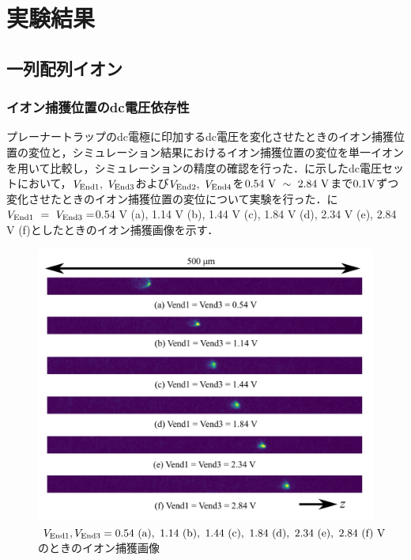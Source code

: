 \chapter{実験結果}\label{result}
\section{一列配列イオン}
\subsection{イオン捕獲位置のdc電圧依存性}\label{quantity_1}
プレーナートラップのdc電極に印加するdc電圧を変化させたときのイオン捕獲位置の変位と，シミュレーション結果におけるイオン捕獲位置の変位を単一イオンを用いて比較し，シミュレーションの精度の確認を行った．に示したdc電圧セットにおいて，$V_{\rm End 1}, \ V_{\rm End3}$および$V_{\rm End 2}, \ V_{\rm End4}$を$0.54 \ {\rm V} \ \sim \ 2.84 \ {\rm V}$まで$0.1 {\rm V}$ずつ変化させたときのイオン捕獲位置の変位について実験を行った．に$V_{\rm End 1} \ = \ V_{\rm End3} = $0.54 V (a), 1.14 V (b), 1.44 V (c), 1.84 V (d), 2.34 V (e), 2.84 V (f)としたときのイオン捕獲画像を示す．

\begin{figure}[h]
	\begin{center}
		\includegraphics[width = 0.6 \linewidth]{./results/figure/displacement_End_Odd.png}
		\caption{$V_{\rm End1}, V_{\rm End3} = 0.54{\rm \ (a)}, \ 1.14{\rm \ (b)}, \ 1.44{\rm \ (c)}, \ 1.84{\rm \ (d)}, \ 2.34{\rm \ (e)}, \ 2.84{\rm \ (f)} \ {\rm V}$のときのイオン捕獲画像}
		\label{fig:displacement_End13}
	\end{center}
\end{figure}

